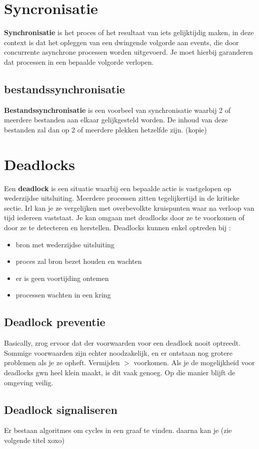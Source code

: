 \documentclass{report}
\begin{document}
   		\section{Syncronisatie}
   			\textbf{Synchronisatie} is het proces of het resultaat van iets gelijktijdig maken, in deze context is dat het opleggen van een dwingende volgorde aan events, die door concurrente asynchrone processen worden uitgevoerd. Je moet hierbij garanderen dat processen in een bepaalde volgorde verlopen. 
   			\subsection{bestandssynchronisatie}
   				\textbf{Bestandssynchronisatie} is een voorbeel van synchronisatie waarbij 2 of meerdere bestanden aan elkaar gelijkgesteld worden. De inhoud van deze bestanden zal dan op 2 of meerdere plekken hetzelfde zijn. (kopie) 
   		\section{Deadlocks}
   			Een \textbf{deadlock} is een situatie waarbij een bepaalde actie is vastgelopen op wederzijdse uitsluiting. Meerdere processen zitten tegelijkertijd in de kritieke sectie. Irl kan je ze vergelijken met overbevolkte kruispunten waar na verloop van tijd iedereen vaststaat. Je kan omgaan met deadlocks door ze te voorkomen of door ze te detecteren en herstellen. Deadlocks kunnen enkel optreden bij : 
   			\begin{itemize}
   				\item bron met wederzijdse uitsluiting
   				\item proces zal bron bezet houden en wachten 
   				\item er is geen voortijding ontemen 
   				\item processen wachten in een kring
   			\end{itemize}
   			\subsection{Deadlock preventie}
   				Basically, zrog ervoor dat der voorwaarden voor een deadlock nooit optreedt. Sommige voorwaarden zijn echter noodzakelijk, en er ontstaan nog grotere problemen als je ze opheft. Vermijden \(>\) voorkomen. Als je de mogelijkheid voor deadlocks gwn heel klein maakt, is dit vaak genoeg. Op die manier blijft de omgeving veilig. 
   			\subsection{Deadlock signaliseren}
   				Er bestaan algoritmes om cycles in een graaf te vinden. daarna kan je (zie volgende titel xoxo)
\end{document}
